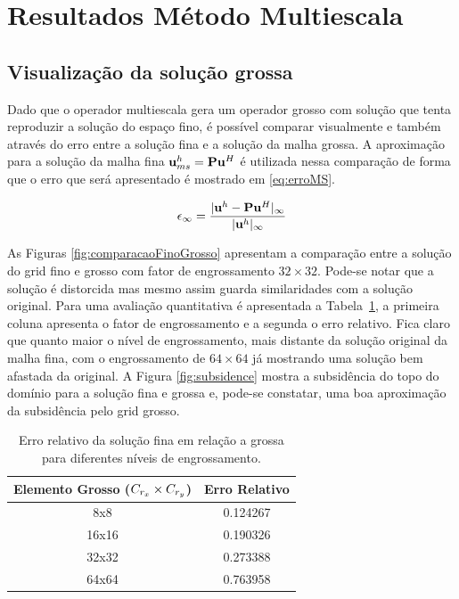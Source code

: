\section{Resultados Método Multiescala}

\subsection{Visualização da solução grossa}

Dado que o operador multiescala gera um operador grosso com solução que tenta reproduzir a solução do espaço fino, é possível comparar visualmente e também através do erro entre a solução fina e a solução da malha grossa. A aproximação para a solução da malha fina $\mathbf{u}^h_{ms} = \mathbf{P} \mathbf{u}^H$ é utilizada nessa comparação de forma que o erro que será apresentado é mostrado em \eqref{eq:erroMS}.

\begin{equation}\label{eq:erroMS}
\epsilon_{\infty} =\frac{|\mathbf{u}^h - \mathbf{P} \mathbf{u}^H|_{\infty}}{|\mathbf{u}^h|_{\infty}}
\end{equation}


As Figuras \ref{fig:comparacaoFinoGrosso} apresentam a comparação entre a solução do grid fino e grosso com fator de engrossamento $32\times32$. Pode-se notar que a solução é distorcida mas mesmo assim guarda similaridades com a solução original. Para uma avaliação quantitativa é apresentada a Tabela~\ref{table:erroRelativoEngrossamento}, a primeira coluna apresenta o fator de engrossamento e a segunda o erro relativo. Fica claro que quanto maior o nível de engrossamento, mais distante da solução original da malha fina, com o engrossamento de $64\times64$ já mostrando uma solução bem afastada da original. 
A Figura \ref{fig:subsidence} mostra a subsidência do topo do domínio para a solução fina e grossa e, pode-se constatar, uma boa aproximação da subsidência pelo grid grosso.


\begin{table}[]
\centering

\caption{Erro relativo da solução fina em relação a grossa para diferentes níveis de engrossamento.}
\label{table:erroRelativoEngrossamento}

\begin{tabular}{|c|c|}
\hline
\textbf{Elemento Grosso ($C_{r_x}\times C_{r_y}$)} & \textbf{Erro Relativo} \\ \hline
8x8                             & 0.124267               \\ \hline
16x16                           & 0.190326               \\ \hline
32x32                           & 0.273388               \\ \hline
64x64                           & 0.763958               \\ \hline
\end{tabular}
\end{table}


